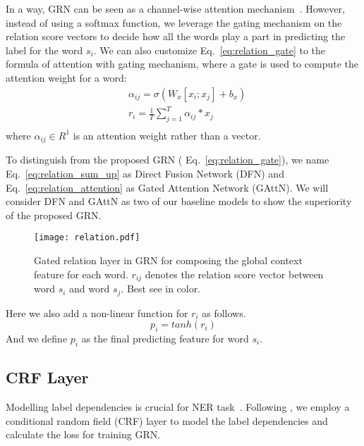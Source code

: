 \documentclass[letterpaper]{article} \usepackage{aaai19}  \usepackage{times}  \usepackage{helvet}  \usepackage{courier}  \usepackage{url}  \usepackage{graphicx}  \usepackage{amsmath}
\newcommand{\ie}{\text{i.e.,}}
\newcommand{\GAN}{GAttN}
\newcommand{\GRN}{GRN}
\begin{document}
In a way, \GRN{} can be seen as a channel-wise attention mechanism~\cite{chen2017sca}. However, instead of using a softmax function, we leverage the gating mechanism on the relation score vectors to decide how all the words play a part in predicting the label for the word $s_i$. We can also customize Eq.~\ref{eq:relation_gate} to the formula of attention with gating mechanism, where a gate is used to compute the attention weight for a word:
\begin{equation}
\begin{aligned}
&\alpha_{ij} = \sigma(W_x[x_i;x_j]+b_x)\\
&r_i = \frac{1}{T}\sum_{j=1}^T \alpha_{ij} *x_j\\
\end{aligned}
\label{eq:relation_attention}
\end{equation}
where $\alpha_{ij} \in R^1$ is an attention weight rather than a vector. 

To distinguish from the proposed \GRN{} (\ie{} Eq.~\ref{eq:relation_gate}), we name Eq.~\ref{eq:relation_sum_up} as Direct Fusion Network (DFN) and Eq.~\ref{eq:relation_attention} as Gated Attention Network (\GAN{}). We will consider DFN and \GAN{} as two of our baseline models to show the superiority of the proposed \GRN{}.

\begin{figure}[!t] \centering
  \texttt{[image: relation.pdf]}
  \caption{Gated relation layer in \GRN{} for composing the global context feature for each word. $r_{ij}$ denotes the relation score vector between word $s_i$ and word $s_j$. Best see in color.}
  \label{fig:relation}
\end{figure}

Here we also add a non-linear function for $r_i$ as follows.
\begin{equation}
\label{eq:pi}
p_i = tanh(r_i)
\end{equation}
And we define $p_i$ as the final predicting feature for word $s_i$.

\subsection{CRF Layer}
Modelling label dependencies is crucial for NER task~\cite{ma2016CNNBLSTMCRF,Liu2018Empower}. Following \cite{ma2016CNNBLSTMCRF,huang2015bidirectional}, we employ a conditional random field (CRF) layer to model the label dependencies and calculate the loss for training \GRN{}.
\end{document}

